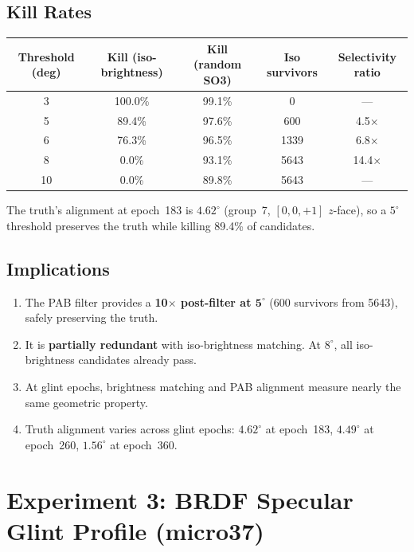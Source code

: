 \documentclass[11pt,a4paper]{article}
\begin{document}
\subsection{Kill Rates}

\begin{table}[H]
\centering
\begin{tabular}{ccccc}
\toprule
Threshold (deg) & Kill (iso-brightness) & Kill (random SO3) & Iso survivors & Selectivity ratio \\
\midrule
3 & 100.0\% & 99.1\% & 0 & --- \\
5 & 89.4\% & 97.6\% & 600 & 4.5$\times$ \\
6 & 76.3\% & 96.5\% & 1339 & 6.8$\times$ \\
8 & 0.0\% & 93.1\% & 5643 & 14.4$\times$ \\
10 & 0.0\% & 89.8\% & 5643 & --- \\
\bottomrule
\end{tabular}
\end{table}

The truth's alignment at epoch~183 is $4.62^\circ$ (group~7, $[0,0,+1]$ $z$-face), so a $5^\circ$ threshold preserves the truth while killing 89.4\% of candidates.

\subsection{Implications}

\begin{enumerate}[leftmargin=2em]
  \item The PAB filter provides a \textbf{10$\times$ post-filter at $\mathbf{5^\circ}$} (600 survivors from 5643), safely preserving the truth.
  \item It is \textbf{partially redundant} with iso-brightness matching. At $8^\circ$, all iso-brightness candidates already pass.
  \item At glint epochs, brightness matching and PAB alignment measure nearly the same geometric property.
  \item Truth alignment varies across glint epochs: $4.62^\circ$ at epoch~183, $4.49^\circ$ at epoch~260, $1.56^\circ$ at epoch~360.
\end{enumerate}

\section{Experiment 3: BRDF Specular Glint Profile (micro37)}
\end{document}
